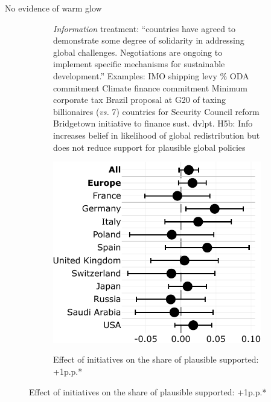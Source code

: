 \documentclass[aspectratio=169,xcolor=dvipsnames, 11pt,mathserif]{beamer}
\begin{document}
\begin{frame}{No evidence of warm glow} 
  \vspace{-.3cm}
    \begin{figure}
\caption{If \textit{warm glow}, support might dissipate when the policy materializes}\vspace{-.4cm}
\begin{subfigure}{.5\textwidth} 
  \bbvs \ip \textit{Information} treatment: ``countries have agreed to demonstrate some degree of solidarity in addressing global challenges.  Negotiations are ongoing to implement specific mechanisms for sustainable development.'' Examples:
  \bbvs \ip IMO shipping levy
  \% ODA commitment
  \ip Climate finance commitment
  \ip Minimum corporate tax
  \ip Brazil proposal at G20 of taxing billionaires
   (\textit{vs.} 7) countries %
  for Security Council reform
  \ip Bridgetown initiative to finance sust. dvlpt.
  \ee
  \ip H5b: Info increases belief in likelihood of global redistribution but does not reduce support for plausible global policies
  \ee
\end{subfigure} \quad \pause
\begin{subfigure}{.47\textwidth} 
  \caption[]{Effect of  initiatives on the share of plausible  supported: +1p.p.* \quad \hyperlink{2SLS}{}}
  \includegraphics[width=.9\textwidth]{../figures/country_comparison/share_solidarity_supported_by_info_solidarity.pdf}
  \\ \quad 
\end{subfigure}
\end{figure}
\end{frame}
\end{document}
